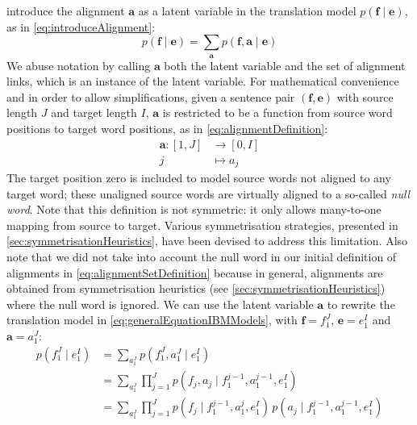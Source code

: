 \citet{brown-dellapietra-dellapietra-mercer-1993} introduce the
alignment $\bm{a}$ as a latent variable in the translation model
$p(\bm{f} \mid \bm{e})$, as in \autoref{eq:introduceAlignment}:
\begin{equation}
  p(\bm{f} \mid \bm{e}) = \sum_{\bm{a}} p(\bm{f}, \bm{a} \mid \bm{e})
  \label{eq:introduceAlignment}
\end{equation}
%
We abuse notation by calling $\bm{a}$ both the latent variable
and the set of alignment links, which is an instance of the latent
variable.
For mathematical convenience and in order to allow simplifications,
given a sentence pair $(\bm{f}, \bm{e})$ with source length
$J$ and target length $I$,
$\bm{a}$ is restricted to be a function from source word positions
to target word positions, as in \autoref{eq:alignmentDefinition}:
%
\begin{equation}
\begin{split}
  \bm{a} : [1, J] &\longrightarrow [0, I] \\
                j &\longmapsto a_j
\end{split}
\label{eq:alignmentDefinition}
\end{equation}
%
The target position zero is included to
model source words not aligned to any target word; these unaligned source words
are virtually aligned to a so-called \emph{null word}. Note that this definition
is not symmetric: it only allows many-to-one mapping from source to target.
Various symmetrisation strategies, presented in \autoref{sec:symmetrisationHeuristics},
have been devised to address this limitation.
Also note that we did not
take into account the null word in our initial definition of alignments
in \autoref{eq:alignmentSetDefinition} because in general, alignments
are obtained from symmetrisation heuristics
(see \autoref{sec:symmetrisationHeuristics}) where the null word
is ignored.
We can use the latent variable
$\bm{a}$ to rewrite the translation model in
\autoref{eq:generalEquationIBMModels}, with $\bm{f} = f_1^J$, $\bm{e} = e_1^I$
and $\bm{a} = a_1^J$:
%
\begin{equation}
  \begin{split}
    p(f_1^J \mid e_1^I) &= \sum_{a_1^J} p(f_1^J, a_1^J \mid e_1^I) \\
                        &= \sum_{a_1^J} \prod_{j = 1}^J p(f_j, a_j \mid f_1^{j - 1}, a_1^{j - 1}, e_1^I) \\
                        &= \sum_{a_1^J} \prod_{j = 1}^J p(f_j \mid f_1^{j - 1}, a_1^j, e_1^I) \, p(a_j \mid f_1^{j - 1}, a_1^{j - 1}, e_1^I) \\
  \end{split}
  \label{eq:generalEquationIBMModels}
\end{equation}
